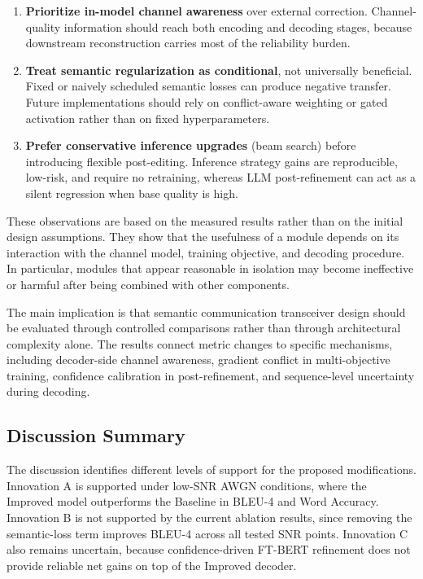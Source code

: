 \begin{enumerate}
    \item \textbf{Prioritize in-model channel awareness} over external correction. Channel-quality information should reach both encoding and decoding stages, because downstream reconstruction carries most of the reliability burden.
    \item \textbf{Treat semantic regularization as conditional}, not universally beneficial. Fixed or naively scheduled semantic losses can produce negative transfer. Future implementations should rely on conflict-aware weighting or gated activation rather than on fixed hyperparameters.
    \item \textbf{Prefer conservative inference upgrades} (beam search) before introducing flexible post-editing. Inference strategy gains are reproducible, low-risk, and require no retraining, whereas LLM post-refinement can act as a silent regression when base quality is high.
\end{enumerate}

These observations are based on the measured results rather than on the initial design assumptions. They show that the usefulness of a module depends on its interaction with the channel model, training objective, and decoding procedure. In particular, modules that appear reasonable in isolation may become ineffective or harmful after being combined with other components.

The main implication is that semantic communication transceiver design should be evaluated through controlled comparisons rather than through architectural complexity alone. The results connect metric changes to specific mechanisms, including decoder-side channel awareness, gradient conflict in multi-objective training, confidence calibration in post-refinement, and sequence-level uncertainty during decoding.

\subsection{Discussion Summary}

The discussion identifies different levels of support for the proposed modifications. Innovation A is supported under low-SNR AWGN conditions, where the Improved model outperforms the Baseline in BLEU-4 and Word Accuracy. Innovation B is not supported by the current ablation results, since removing the semantic-loss term improves BLEU-4 across all tested SNR points. Innovation C also remains uncertain, because confidence-driven FT-BERT refinement does not provide reliable net gains on top of the Improved decoder.

